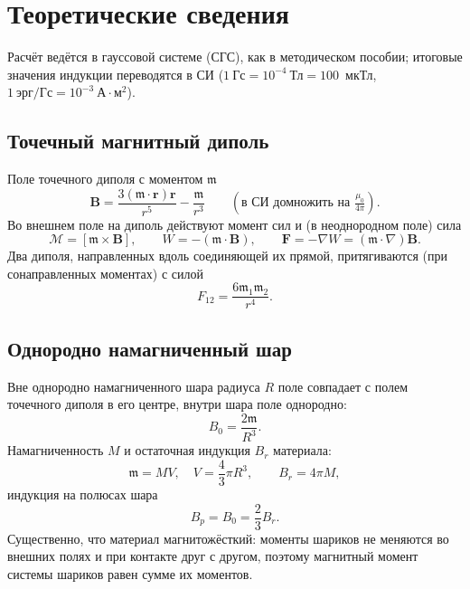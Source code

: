 \documentclass[a4paper,12pt]{article}
\newcommand{\mm}{\mathfrak{m}}
\begin{document}
\section{Теоретические сведения}
Расчёт ведётся в гауссовой системе (СГС), как в методическом пособии;
итоговые значения индукции переводятся в СИ ($1~\text{Гс} = 10^{-4}~\text{Тл}
= 100$~мкТл, $1~\text{эрг/Гс} = 10^{-3}~\text{А}\cdot\text{м}^2$).

\subsection{Точечный магнитный диполь}
Поле точечного диполя с моментом $\boldsymbol{\mm}$
\begin{equation}
    \label{eq:dipole}
    \mathbf{B} = \frac{3(\boldsymbol{\mm}\cdot\mathbf{r})\mathbf{r}}{r^5}
                 - \frac{\boldsymbol{\mm}}{r^3}
    \qquad \left(\text{в СИ домножить на } \tfrac{\mu_0}{4\pi}\right).
\end{equation}
Во внешнем поле на диполь действуют момент сил и (в неоднородном поле) сила
\begin{equation}
    \label{eq:torque}
    \boldsymbol{\mathcal{M}} = [\boldsymbol{\mm}\times\mathbf{B}],
    \qquad
    W = -(\boldsymbol{\mm}\cdot\mathbf{B}),
    \qquad
    \mathbf{F} = -\nabla W = (\boldsymbol{\mm}\cdot\nabla)\mathbf{B}.
\end{equation}
Два диполя, направленных вдоль соединяющей их прямой, притягиваются (при
сонаправленных моментах) с силой
\begin{equation}
    \label{eq:F12}
    F_{12} = \frac{6\mm_1\mm_2}{r^4}.
\end{equation}

\subsection{Однородно намагниченный шар}
Вне однородно намагниченного шара радиуса $R$ поле совпадает с полем
точечного диполя в его центре, внутри шара поле однородно:
\begin{equation}
    \label{eq:B0ball}
    B_0 = \frac{2\mm}{R^3}.
\end{equation}
Намагниченность $M$ и остаточная индукция $B_r$ материала:
\begin{equation}
    \label{eq:magnetization}
    \mm = MV, \quad V = \frac{4}{3}\pi R^3, \qquad B_r = 4\pi M,
\end{equation}
индукция на полюсах шара
\begin{equation}
    \label{eq:Bp}
    B_p = B_0 = \frac{2}{3}B_r.
\end{equation}
Существенно, что материал магнитожёсткий: моменты шариков не меняются во
внешних полях и при контакте друг с другом, поэтому магнитный момент
системы шариков равен сумме их моментов.
\end{document}
